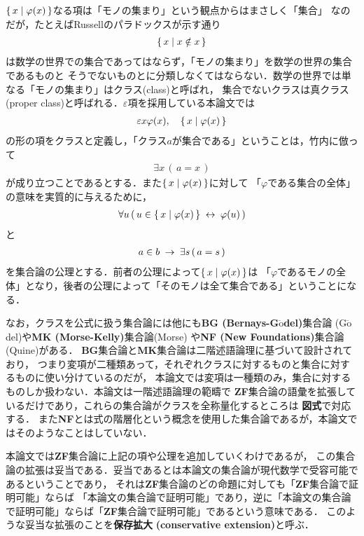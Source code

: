 	$\{\, x \mid \varphi(x)\, \}$なる項は「モノの集まり」という観点からはまさしく「集合」
	なのだが，たとえばRussellのパラドックスが示す通り
	\begin{align}
		\{\, x \mid x \notin x\, \}
	\end{align}
	は数学の世界での集合であってはならず，「モノの集まり」を数学の世界の集合であるものと
	そうでないものとに分類しなくてはならない．数学の世界では単なる「モノの集まり」はクラス(class)と呼ばれ，
	集合でないクラスは真クラス(proper class)と呼ばれる．$\varepsilon$項を採用している本論文では
	\begin{align}
		\varepsilon x \varphi(x),\quad \{\, x \mid \varphi(x)\, \}
	\end{align}
	の形の項をクラスと定義し，「クラス$a$が集合である」ということは，竹内\cite{TakeuchiSet}に倣って
	\begin{align}
		\exists x\, (\, a = x\, )
	\end{align}
	が成り立つことであるとする．また$\{\, x \mid \varphi(x)\, \}$に対して
	「$\varphi$である集合の全体」の意味を実質的に与えるために，
	\begin{align}
		\forall u\, (\, u \in \{\, x \mid \varphi(x)\, \} \hspace{0.25em}\leftrightarrow\hspace{0.25em} \varphi(u)\, )
	\end{align}
	と
	\begin{align}
		a \in b \hspace{0.25em}\rightarrow\hspace{0.25em} \exists s\, (\, a = s\, )
	\end{align}
	を集合論の公理とする．前者の公理によって$\{\, x \mid \varphi(x)\, \}$は
	「$\varphi$であるモノの全体」となり，後者の公理によって「そのモノは全て集合である」ということになる．
	
	なお，クラスを公式に扱う集合論には他にも{\bf BG (Bernays-G$\ddot{\mbox{o}}$del)}集合論
	(G$\ddot{\mbox{o}}$del\cite{Godel})や{\bf MK (Morse-Kelly)}集合論(Morse\cite{Morse})
	や{\bf NF (New Foundations)}集合論(Quine\cite{Quine})がある．
	{\bf BG}集合論と{\bf MK}集合論は二階述語論理に基づいて設計されており，
	つまり変項が二種類あって，それぞれクラスに対するものと集合に対するものに使い分けているのだが，
	本論文では変項は一種類のみ，集合に対するものしか扱わない．本論文は一階述語論理の範疇で
	{\bf ZF}集合論の語彙を拡張しているだけであり，これらの集合論がクラスを全称量化するところは
	{\bf 図式}で対応する．
	また{\bf NF}とは式の階層化という概念を使用した集合論であるが，本論文ではそのようなことはしていない．
	
	本論文では{\bf ZF}集合論に上記の項や公理を追加していくわけであるが，
	この集合論の拡張は妥当である．妥当であるとは本論文の集合論が現代数学で受容可能であるということであり，
	それは{\bf ZF}集合論のどの命題に対しても「{\bf ZF}集合論で証明可能」ならば
	「本論文の集合論で証明可能」であり，逆に「本論文の集合論で証明可能」ならば「{\bf ZF}集合論で証明可能」であるという意味である．
	このような妥当な拡張のことを{\bf 保存拡大}
	{\bf (conservative extension)}と呼ぶ．
	
